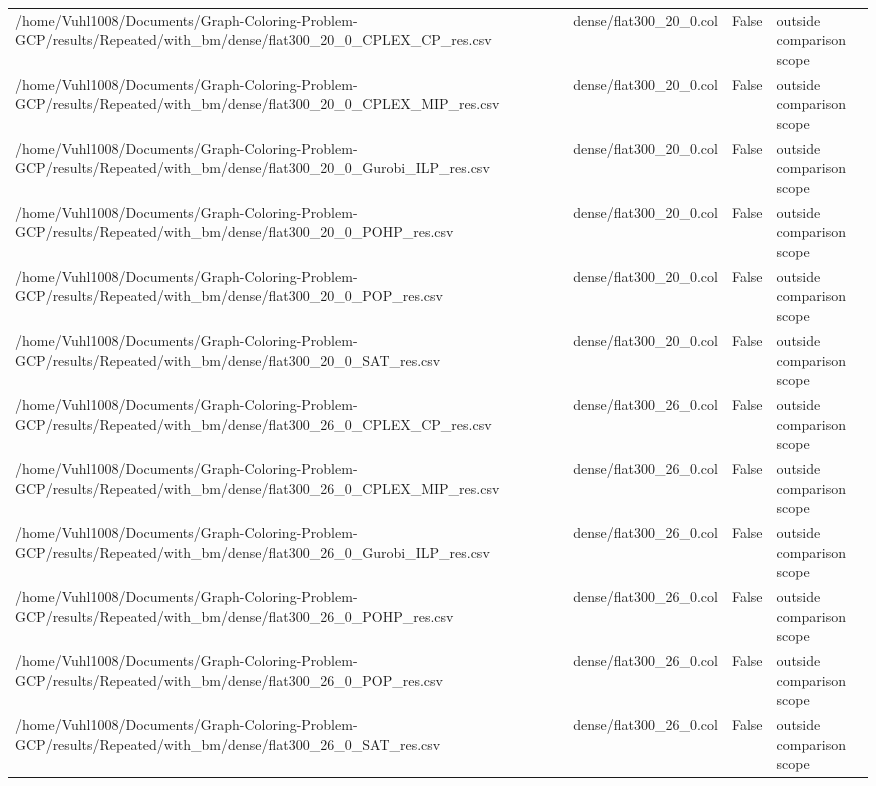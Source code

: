 \begin{table}[htbp]
\begin{tabular}{llll}
/home/Vuhl1008/Documents/Graph-Coloring-Problem-GCP/results/Repeated/with\_bm/dense/flat300\_20\_0\_CPLEX\_CP\_res.csv & dense/flat300\_20\_0.col & False & outside comparison scope \\
/home/Vuhl1008/Documents/Graph-Coloring-Problem-GCP/results/Repeated/with\_bm/dense/flat300\_20\_0\_CPLEX\_MIP\_res.csv & dense/flat300\_20\_0.col & False & outside comparison scope \\
/home/Vuhl1008/Documents/Graph-Coloring-Problem-GCP/results/Repeated/with\_bm/dense/flat300\_20\_0\_Gurobi\_ILP\_res.csv & dense/flat300\_20\_0.col & False & outside comparison scope \\
/home/Vuhl1008/Documents/Graph-Coloring-Problem-GCP/results/Repeated/with\_bm/dense/flat300\_20\_0\_POHP\_res.csv & dense/flat300\_20\_0.col & False & outside comparison scope \\
/home/Vuhl1008/Documents/Graph-Coloring-Problem-GCP/results/Repeated/with\_bm/dense/flat300\_20\_0\_POP\_res.csv & dense/flat300\_20\_0.col & False & outside comparison scope \\
/home/Vuhl1008/Documents/Graph-Coloring-Problem-GCP/results/Repeated/with\_bm/dense/flat300\_20\_0\_SAT\_res.csv & dense/flat300\_20\_0.col & False & outside comparison scope \\
/home/Vuhl1008/Documents/Graph-Coloring-Problem-GCP/results/Repeated/with\_bm/dense/flat300\_26\_0\_CPLEX\_CP\_res.csv & dense/flat300\_26\_0.col & False & outside comparison scope \\
/home/Vuhl1008/Documents/Graph-Coloring-Problem-GCP/results/Repeated/with\_bm/dense/flat300\_26\_0\_CPLEX\_MIP\_res.csv & dense/flat300\_26\_0.col & False & outside comparison scope \\
/home/Vuhl1008/Documents/Graph-Coloring-Problem-GCP/results/Repeated/with\_bm/dense/flat300\_26\_0\_Gurobi\_ILP\_res.csv & dense/flat300\_26\_0.col & False & outside comparison scope \\
/home/Vuhl1008/Documents/Graph-Coloring-Problem-GCP/results/Repeated/with\_bm/dense/flat300\_26\_0\_POHP\_res.csv & dense/flat300\_26\_0.col & False & outside comparison scope \\
/home/Vuhl1008/Documents/Graph-Coloring-Problem-GCP/results/Repeated/with\_bm/dense/flat300\_26\_0\_POP\_res.csv & dense/flat300\_26\_0.col & False & outside comparison scope \\
/home/Vuhl1008/Documents/Graph-Coloring-Problem-GCP/results/Repeated/with\_bm/dense/flat300\_26\_0\_SAT\_res.csv & dense/flat300\_26\_0.col & False & outside comparison scope \\

\end{tabular}
\end{table}

